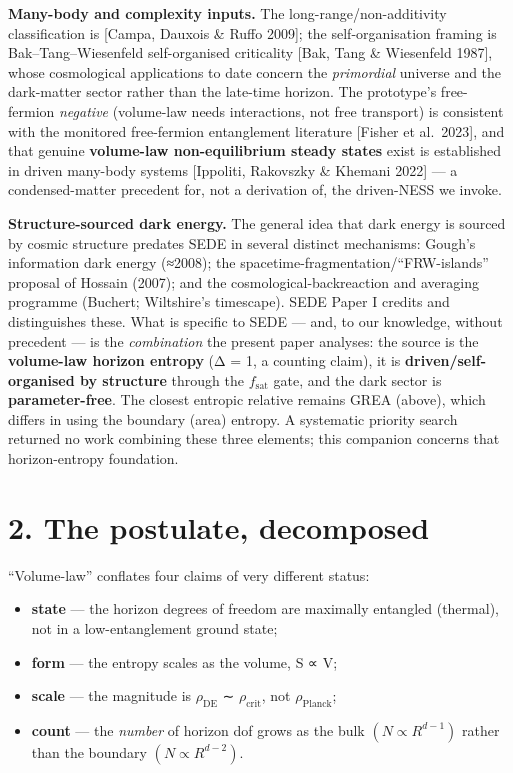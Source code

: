 \documentclass[
  10pt,
]{article}
\providecommand{\tightlist}{%
  \setlength{\itemsep}{0pt}\setlength{\parskip}{0pt}}
\begin{document}
\textbf{Many-body and complexity inputs.} The long-range/non-additivity
classification is {[}Campa, Dauxois \& Ruffo 2009{]}; the
self-organisation framing is Bak--Tang--Wiesenfeld self-organised
criticality {[}Bak, Tang \& Wiesenfeld 1987{]}, whose cosmological
applications to date concern the \emph{primordial} universe and the
dark-matter sector rather than the late-time horizon. The prototype's
free-fermion \emph{negative} (volume-law needs interactions, not free
transport) is consistent with the monitored free-fermion entanglement
literature {[}Fisher et al.~2023{]}, and that genuine \textbf{volume-law
non-equilibrium steady states} exist is established in driven many-body
systems {[}Ippoliti, Rakovszky \& Khemani 2022{]} --- a condensed-matter
precedent for, not a derivation of, the driven-NESS we invoke.

\textbf{Structure-sourced dark energy.} The general idea that dark
energy is sourced by cosmic structure predates SEDE in several distinct
mechanisms: Gough's information dark energy (≈2008); the
spacetime-fragmentation/``FRW-islands'' proposal of Hossain (2007); and
the cosmological-backreaction and averaging programme (Buchert;
Wiltshire's timescape). SEDE Paper I credits and distinguishes these.
What is specific to SEDE --- and, to our knowledge, without precedent
--- is the \emph{combination} the present paper analyses: the source is
the \textbf{volume-law horizon entropy} (Δ = 1, a counting claim), it is
\textbf{driven/self-organised by structure} through the
\(f_{\mathrm{sat}}\) gate, and the dark sector is
\textbf{parameter-free}. The closest entropic relative remains GREA
(above), which differs in using the boundary (area) entropy. A
systematic priority search returned no work combining these three
elements; this companion concerns that horizon-entropy foundation.

\section{2. The postulate, decomposed}\label{the-postulate-decomposed}

``Volume-law'' conflates four claims of very different status:

\begin{itemize}
\tightlist
\item
  \textbf{state} --- the horizon degrees of freedom are maximally
  entangled (thermal), not in a low-entanglement ground state;
\item
  \textbf{form} --- the entropy scales as the volume, S ∝ V;
\item
  \textbf{scale} --- the magnitude is \(\rho _{\mathrm{DE}}\) ∼
  \(\rho _{\mathrm{crit}}\), not \(\rho _{\mathrm{Planck}}\);
\item
  \textbf{count} --- the \emph{number} of horizon dof grows as the bulk
  \((N \propto  R^{d-1})\) rather than the boundary
  \((N \propto  R^{d-2})\).
\end{itemize}
\end{document}
